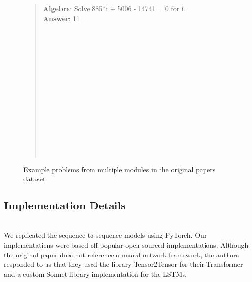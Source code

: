 \begin{figure}[h]
\begin{verse}{}
\textbf{Algebra}: Solve 885*i + 5006 - 14741 = 0 for i.  \\
\textbf{Answer}: 11 \\
\\
 \\
\\
 \\
\\
\\
\\
\\
 \\
\\
 \\
\\
\\
\\



\end{verse}
\caption{Example problems from multiple modules in the original papers dataset}
\end{figure}
 
 
\subsection{Implementation Details} \\

We replicated the sequence to sequence models using PyTorch\supercite{paszke2019pytorch}. Our implementations were based off popular open-sourced implementations\supercite{nlp-tutorial}\supercite{pytorch_math_dataset}\supercite{attention-is-all-you-need}. Although the original paper does not reference a neural network framework, the authors responded to us that they used the library Tensor2Tensor\supercite{vaswani2018tensor2tensor} for their Transformer and a custom Sonnet\supercite{sonnet} library implementation for the LSTMs.\\

